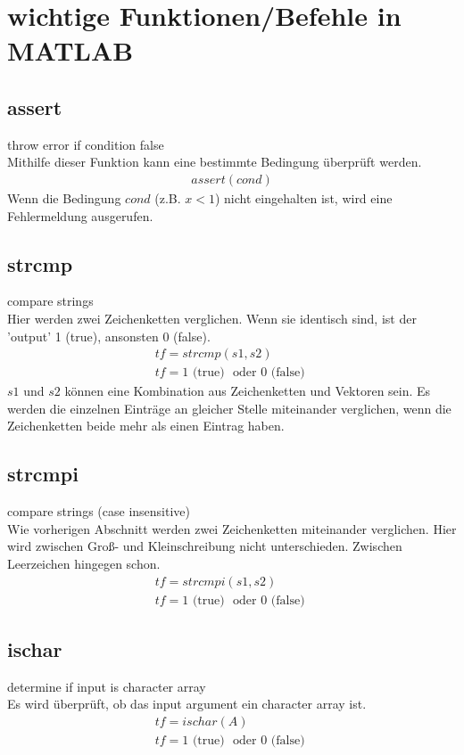 \documentclass[12pt,bibstyle=none,pagenumberinfooter]{ifmdocument}
\begin{document}
	\section{wichtige Funktionen/Befehle in MATLAB}
	\subsection{assert}
		\glqq throw error if condition false\grqq{}\\
		Mithilfe dieser Funktion kann eine bestimmte Bedingung \"uberpr\"uft werden. 
		\begin{gather*}
			assert(cond)
		\end{gather*}
		Wenn die Bedingung $cond$ (z.B. $x < 1$) nicht eingehalten ist, wird eine Fehlermeldung ausgerufen.
	\subsection{strcmp}
		\glqq compare strings\grqq{}\\
		Hier werden zwei Zeichenketten verglichen. Wenn sie identisch sind, ist der 'output' 1 (true), ansonsten 0 (false). 
		\begin{gather*}
			tf = strcmp(s1,s2)\\
			tf = 1 \text{ (true) } \text{ oder } 0 \text{ (false) }
		\end{gather*}
		$s1$ und $s2$ k\"onnen eine Kombination aus Zeichenketten und Vektoren sein. Es werden die einzelnen Eintr\"age an gleicher Stelle miteinander verglichen, wenn die Zeichenketten beide mehr als einen Eintrag haben.
	\subsection{strcmpi}
		\glqq  compare strings (case insensitive)\grqq{}\\
		Wie vorherigen Abschnitt werden zwei Zeichenketten miteinander verglichen. Hier wird zwischen Groß- und Kleinschreibung nicht unterschieden. Zwischen Leerzeichen hingegen schon. 
		\begin{gather*}
			tf = strcmpi(s1,s2)\\
			tf = 1 \text{ (true) } \text{ oder } 0 \text{ (false) }
		\end{gather*}
	\subsection{ischar}
		\glqq determine if input is character array\grqq{}\\
		Es wird \"uberpr\"uft, ob das \glqq input argument\grqq{} ein \glqq character array\grqq{} ist.
		\begin{gather*}
			tf = ischar(A)\\
			tf = 1 \text{ (true) } \text{ oder } 0 \text{ (false) }
		\end{gather*}
\end{document}
